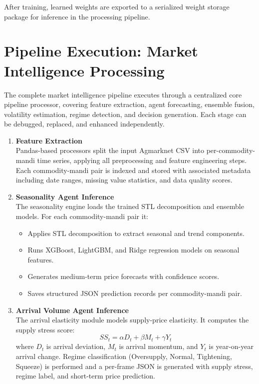 \documentclass[12pt,a4paper]{report}
\theoremstyle{definition}
\theoremstyle{remark}
\begin{document}
After training, learned weights are exported to a serialized weight storage package for inference in the processing pipeline.

\section{Pipeline Execution: Market Intelligence Processing}

The complete market intelligence pipeline executes through a centralized core pipeline processor, covering feature extraction, agent forecasting, ensemble fusion, volatility estimation, regime detection, and decision generation. Each stage can be debugged, replaced, and enhanced independently.

\begin{enumerate}

\item \textbf{Feature Extraction}\\
Pandas-based processors split the input Agmarknet CSV into per-commodity-mandi time series, applying all preprocessing and feature engineering steps. Each commodity-mandi pair is indexed and stored with associated metadata including date ranges, missing value statistics, and data quality scores.

\item \textbf{Seasonality Agent Inference}\\
The seasonality engine loads the trained STL decomposition and ensemble models. For each commodity-mandi pair it:
    \begin{itemize}
        \item Applies STL decomposition to extract seasonal and trend components.
        \item Runs XGBoost, LightGBM, and Ridge regression models on seasonal features.
        \item Generates medium-term price forecasts with confidence scores.
        \item Saves structured JSON prediction records per commodity-mandi pair.
    \end{itemize}

\item \textbf{Arrival Volume Agent Inference}\\
The arrival elasticity module models supply-price elasticity. It computes the supply stress score:
\begin{equation}
SS_t = \alpha D_t + \beta M_t + \gamma Y_t
\end{equation}
where $D_t$ is arrival deviation, $M_t$ is arrival momentum, and $Y_t$ is year-on-year arrival change. Regime classification (Oversupply, Normal, Tightening, Squeeze) is performed and a per-frame JSON is generated with supply stress, regime label, and short-term price prediction.


\end{enumerate}
\end{document}
